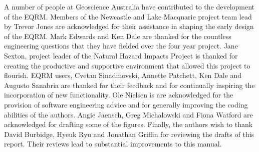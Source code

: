 \documentclass[a4paper, 12pt]{report}
\begin{document}
A number of people at Geoscience Australia have contributed to the
development of the EQRM. Members of the Newcastle and Lake Macquarie
project team lead by Trevor Jones are acknowledged for their
assistance in shaping the early design of the EQRM. Mark Edwards and
Ken Dale are thanked for the countless engineering questions that they
have fielded over the four year project. Jane Sexton, project leader
of the Natural Hazard Impacts Project is thanked for creating the
productive and supportive environment that allowed this project to
flourish. EQRM users, Cvetan Sinadinovski, Annette Patchett, Ken Dale
and Augusto Sanabria are thanked for their feedback and for
continually inspiring the incorporation of new functionality. Ole
Nielsen is are acknowledged for the provision of software engineering
advice and for generally improving the coding abilities of the
authors. Angie Jaensch, Greg Michalowski and Fiona Watford are
acknowledged for drafting some of the figures.  Finally, the authors
wish to thank David Burbidge, Hyeuk Ryu and Jonathan Griffin for reviewing
the drafts of this report. Their reviews lead to substantial
improvements to this manual.


\tableofcontents

\newpage
{}









\appendix


\small

%
\printindex
\end{document}
